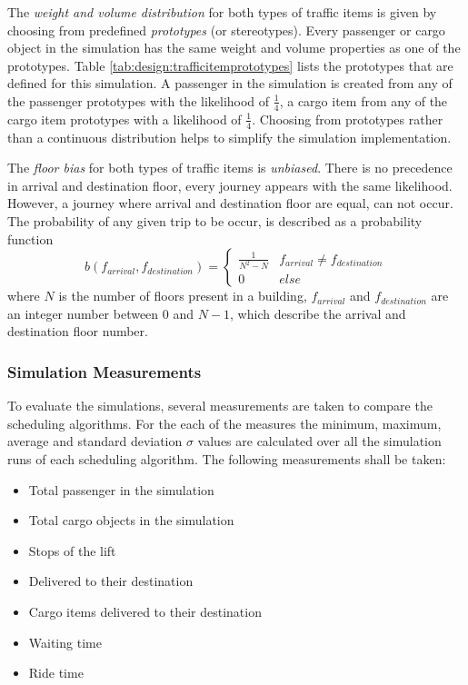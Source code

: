 The \emph{weight and volume distribution} for both types of traffic items is given by choosing from predefined \emph{prototypes} (or stereotypes).
Every passenger or cargo object in the simulation has the same weight and volume properties as one of the prototypes.
Table \ref{tab:design:trafficitemprototypes} lists the prototypes that are defined for this simulation.
A passenger in the simulation is created from any of the passenger prototypes with the likelihood of $ \frac{1}{4} $, a cargo item from any of the cargo item prototypes with a likelihood of $ \frac{1}{4} $.
Choosing from prototypes rather than a continuous distribution helps to simplify the simulation implementation.

The \emph{floor bias} for both types of traffic items is \emph{unbiased}. 
There is no precedence in arrival and destination floor, every journey appears with the same likelihood.
However, a journey where arrival and destination floor are equal, can not occur.
The probability of any given trip to be occur, is described as a probability function
$$ b(f_{arrival}, f_{destination}) =
    \begin{cases} 
      \frac{1}{N^2 - N} & f_{arrival} \neq f_{destination} \\
      0 & else
   \end{cases}
$$
where $ N $ is the number of floors present in a building, $ f_{arrival} $ and  $ f_{destination} $ are an integer number between 0 and $ N - 1$, which describe the arrival and destination floor number.

\subsubsection{Simulation Measurements}
To evaluate the simulations, several measurements are taken to compare the scheduling algorithms.
For the each of the measures the minimum, maximum, average and standard deviation $ \sigma{} $ values are calculated over all the simulation runs of each scheduling algorithm.  
The following measurements shall be taken:
\begin{samepage}
\begin{itemize}[noitemsep]
    \item Total passenger in the simulation
    \item Total cargo objects in the simulation
    \item Stops of the lift
    \item Delivered to their destination
    \item Cargo items delivered to their destination
    \item Waiting time
    \item Ride time
\end{itemize}
\end{samepage}
 



